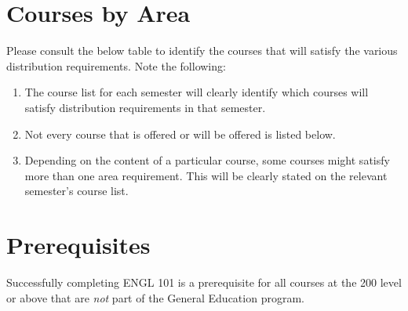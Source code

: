 \documentclass[oneside]{article}
\begin{document}
\section*{Courses by Area}

Please consult the below table to identify the courses that will satisfy the various distribution requirements. Note the following: 
\begin{enumerate}
\item The course list for each semester will clearly identify which courses will satisfy distribution requirements in that semester. 
\item Not every course that is offered or will be offered is listed below. 
\item Depending on the content of a particular course, some courses might satisfy more than one area requirement. This will be clearly stated on the relevant semester's course list. 
\end{enumerate}

\section*{Prerequisites}
Successfully completing ENGL 101 is a prerequisite for all courses at the 200 level or above that are \emph{not} part of the General Education program. 
\end{document}
